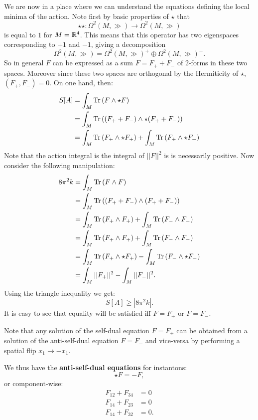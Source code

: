 	We are now in a place where we can understand the equations defining the local minima of the action. Note first by basic properties of $\star$ that
	\begin{equation}
		\star \star: \Omega^2(M, \gg) \to \Omega^2(M, \gg)
	\end{equation}
	is equal to $1$ for $M = \mathbb{R}^4$. This means that this operator has two eigenspaces corresponding to $+1$ and $-1$, giving a decomposition
	\begin{equation}
		\Omega^2(M, \gg) = \Omega^2(M, \gg)^+ \oplus \Omega^2(M, \gg)^-.
	\end{equation}
	So in general $F$ can be expressed as a sum $F = F_+ + F_-$ of 2-forms in these two spaces. Moreover since these two spaces are orthogonal by the Hermiticity of $\star$, $(F_+, F_-) = 0$. On one hand, then:
	\[
	\begin{aligned}
		S[A] &= \int_M \mathrm{Tr}\,(F \wedge \star F)\\
			 &= \int_M \mathrm{Tr}\,((F_+ + F_-) \wedge \star(F_+ + F_-))\\
			 &= \int_M \mathrm{Tr}\,(F_+ \wedge \star F_+) + \int_M \mathrm{Tr}\,(F_+ \wedge \star F_+)\\
	\end{aligned}
	\]
	Note that the action integral is the integral of $||F||^2$ is is necessarily positive. Now consider the following manipulation:
	\[
	\begin{aligned}
		8\pi^2 k &= \int_M \mathrm{Tr}\,(F \wedge F) \\
		  &= \int_M \mathrm{Tr}\,((F_+ + F_-)\wedge (F_+ + F_-)) \\
		  &= \int_M \mathrm{Tr}\,(F_+ \wedge F_+) + \int_M \mathrm{Tr}\,(F_- \wedge F_-) \\
		  &= \int_M \mathrm{Tr}\,(F_+ \wedge F_+) + \int_M \mathrm{Tr}\,(F_- \wedge F_-) \\
		  &= \int_M \mathrm{Tr}\,(F_+ \wedge \star F_+) - \int_M \mathrm{Tr}\,(F_- \wedge \star F_-)\\
		  &= \int_M ||F_+||^2 - \int_M ||F_-||^2.
	\end{aligned}
	\]
	Using the triangle inequality we get:
	\begin{equation}
		S[A] \geq |8 \pi^2 k|.
	\end{equation}
	It is easy to see that equality will be satisfied iff $F = F_+$ or $F=F_-$.
	
	Note that any solution of the self-dual equation $F=F_+$ can be obtained from a solution of the anti-self-dual equation $F=F_-$ and vice-versa by performing a spatial flip $x_1 \to - x_1$.
	
	We thus have the \textbf{anti-self-dual equations} for instantons:
	\begin{equation}\label{eq:asd1}
		\star F = - F,
	\end{equation}
	or component-wise:
	\begin{equation}
		\begin{aligned}
			F_{12} + F_{34} &= 0\\
			F_{14} + F_{23} &= 0\\
			F_{14} + F_{32} &= 0.
		\end{aligned}
	\end{equation}
	
